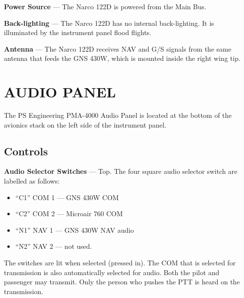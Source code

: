 \textbf{Power Source} --- The Narco 122D is powered from the Main Bus.

\textbf{Back-lighting} --- The Narco 122D has no internal back-lighting. It is illuminated by the instrument panel flood flights.

\textbf{Antenna} --- The Narco 122D receives NAV and G/S signals from the same antenna that feeds the GNS 430W, which is mounted inside the right wing tip.

{}
\section{AUDIO PANEL}

The PS Engineering PMA-4000 Audio Panel is located at the bottom of the avionics stack on the left side of the instrument panel.

\subsection*{Controls}

\textbf{Audio Selector Switches} --- Top. The four square audio selector switch are labelled as follows:
\begin{itemize}
\item ``C1'' COM 1 --- GNS 430W COM
\item ``C2'' COM 2 --- Microair 760 COM
\item ``N1'' NAV 1 --- GNS 430W NAV audio
\item ``N2'' NAV 2 --- not used.
\end{itemize}

The switches are lit when selected (pressed in). The COM that is selected for transmission is also automatically selected for audio. Both the pilot and passenger may transmit. Only the person who pushes the PTT is heard on the transmission.

